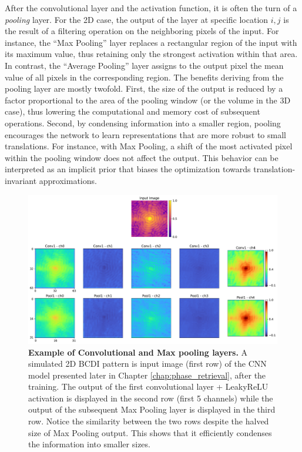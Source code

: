 After the convolutional layer and the activation function, it is often the turn of a \textit{pooling} layer. For the 2D case, 
the output of the layer at specific location $i,j$ is the result of a filtering operation on the neighboring pixels 
of the input. For instance, the ``Max Pooling'' layer replaces a rectangular region of the input with its maximum value, 
thus retaining only the strongest activation within that area. In contrast, the ``Average Pooling'' layer 
assigns to the output pixel the mean value of all pixels in the corresponding region. 
The benefits deriving from the pooling layer are mostly twofold. First, the size of the output is reduced by a factor 
proportional to the area of the pooling window (or the volume in the 3D case), thus lowering the computational 
and memory cost of subsequent operations. Second, by condensing information into a smaller region, pooling encourages 
the network to learn representations that are more robust to small translations. For instance, with Max Pooling, 
a shift of the most activated pixel within the pooling window does not affect the output. This behavior can be 
interpreted as an implicit prior that biases the optimization towards translation-invariant approximations. 

\begin{figure}[H]
    \centering
    \includegraphics[width=\textwidth]{figures/Intro/conv_maxpool.pdf}
    \caption{\textbf{Example of Convolutional and Max pooling layers.} A simulated 2D BCDI pattern is input image 
    (first row) of the CNN model presented later in Chapter \ref{chap:phase_retrieval}, after the training. The output of the first 
    convolutional layer + LeakyReLU activation is displayed in the second row (first 5 channels) while the output of 
    the subsequent Max Pooling layer is displayed in the third row. Notice the similarity between the two rows despite 
    the halved size of Max Pooling output. This shows that it efficiently condenses the information into smaller sizes.
    }
    \label{fig:convmaxpool}
\end{figure}


